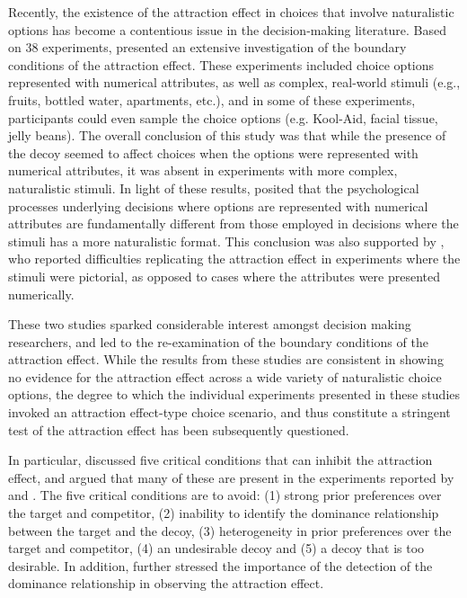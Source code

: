 \documentclass[12pt, a4paper]{article}
\begin{document}
Recently, the existence of the attraction effect in choices that involve naturalistic options has become a contentious issue in the decision-making literature. Based on 38 experiments,  presented an extensive investigation of the boundary conditions of the attraction effect. These experiments included choice options represented with numerical attributes, as well as complex, real-world stimuli (e.g., fruits, bottled water, apartments, etc.), and in some of these experiments, participants could even sample the choice options (e.g. Kool-Aid, facial tissue, jelly beans). The overall conclusion of this study was that while the presence of the decoy seemed to affect choices when the options were represented with numerical attributes, it was absent in experiments with more complex, naturalistic stimuli. In light of these results, \citeauthor{Frederick2014} posited that the psychological processes underlying decisions where options are represented with numerical attributes are fundamentally different from those employed in decisions where the stimuli has a more naturalistic format. This conclusion was also supported by , who reported difficulties replicating the attraction effect in experiments where the stimuli were pictorial, as opposed to cases where the attributes were presented numerically.

These two studies sparked considerable interest amongst decision making researchers, and led to the re-examination of the boundary conditions of the attraction effect. While the results from these studies are consistent in showing no evidence for the attraction effect across a wide variety of naturalistic choice options, the degree to which the individual experiments presented in these studies invoked an attraction effect-type choice scenario, and thus constitute a stringent test of the attraction effect has been subsequently questioned.
  
In particular,  discussed five critical conditions that can inhibit the attraction effect, and argued that many of these are present in the experiments reported by  and . The five critical conditions are to avoid: (1) strong prior preferences over the target and competitor, (2) inability to identify the dominance relationship  between the target and the decoy, (3) heterogeneity in prior preferences over the target and competitor, (4) an undesirable decoy and (5) a decoy that is too desirable. In addition,  further stressed the importance of the detection of the dominance relationship in observing the attraction effect. 
\end{document}
